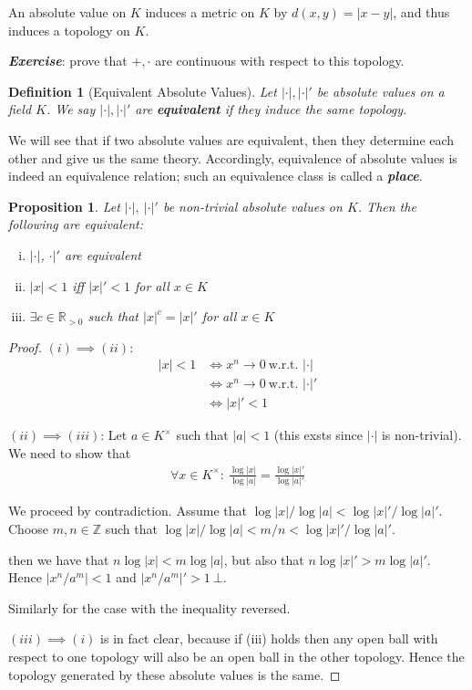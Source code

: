\documentclass[]{article}
\theoremstyle{custhm}
\theoremstyle{cusdef}
\newtheorem{defin}[theorem]{Definition}
\theoremstyle{custhm}
\theoremstyle{custhm}
\newtheorem{prop}[theorem]{Proposition}
\theoremstyle{custhm}
\theoremstyle{cusdef}
\theoremstyle{remark}
\newcommand{\Z}{\mathbb{Z}}
\newcommand{\R}{\mathbb{R}}
\newcommand{\ra}{\rightarrow}
\newcommand{\undf}[1]{\textit{\textbf{#1}}}
\begin{document}
An absolute value on $K$ induces a metric on $K$ by $d(x,y) = |x-y|$, and thus induces a topology on $K$.

\undf{Exercise}: prove that $+,\cdot$ are continuous with respect to this topology.

\begin{defin}[Equivalent Absolute Values]
Let $|\cdot|,|\cdot|'$ be absolute values on a field $K$. We say $|\cdot|,|\cdot|'$ are \undf{equivalent} if they induce the same topology.
\end{defin}

We will see that if two absolute values are equivalent, then they determine each other and give us the same theory. Accordingly, equivalence of absolute values is indeed an equivalence relation; such an equivalence class is called a \undf{place}.

\begin{prop}
	Let $|\cdot|,\ |\cdot|'$ be non-trivial absolute values on $K$. Then the following are equivalent:
	\begin{enumerate}[(i)]
		\item $|\cdot|$, $\cdot|'$ are equivalent
		\item $|x| < 1$ iff $|x|' < 1$ for all $x \in K$
		\item $\exists c\in\R_{>0}$ such that $|x|^c = |x|'$ for all $x\in K$
	\end{enumerate}
\end{prop}

\begin{proof}
$(i)\implies (ii)$:
\begin{align*}
|x| < 1 &\iff x^n \ra 0\ \textrm{w.r.t. }|\cdot|\\
&\iff x^n \ra 0\ \textrm{w.r.t. }|\cdot|'\\
&\iff |x|' < 1
\end{align*}

$(ii)\implies (iii)$: Let $a\in K^{\times}$ such that $|a| < 1$ (this exsts since $|\cdot|$ is non-trivial). We need to show that
\begin{align*}
	\forall x\in K^\times:\ \frac{\log|x|}{\log|a|} = \frac{\log|x|'}{\log|a|'}
\end{align*}

We proceed by contradiction. Assume that $\log|x|/\log|a| < \log|x|'/\log|a|'$. Choose $m,n\in\Z$ such that $\log|x|/\log|a| < m/n < \log|x|'/\log|a|'$.

then we have that $n\log|x| < m\log|a|$, but also that $n\log|x|' > m\log|a|'$. Hence $|x^n/a^m| < 1$ and $|x^n/a^m|' > 1\  \bot$.

Similarly for the case with the inequality reversed.

$(iii)\implies (i)$ is in fact clear, because if (iii) holds then any open ball with respect to one topology will also be an open ball in the other topology. Hence the topology generated by these absolute values is the same.
\end{proof}
\end{document}
